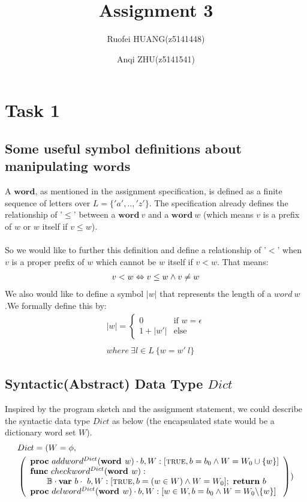 \documentclass[a4paper,12pt,fleqn]{scrartcl}
\title{Assignment 3}
\author{Ruofei HUANG(z5141448)\and
Anqi ZHU(z5141541)
}
\newcommand{\WORD}{\textbf{word }}
\begin{document}
\maketitle
\section{Task 1}
\subsection{Some useful symbol definitions about manipulating $\textbf{word}$s }
A $\textbf{word}$, as mentioned in the assignment specification, is defined as a 
finite sequence of letters over $L = \{'a', .., 'z'\}$. The specification 
already defines the relationship of '$\leq$' between a $\textbf{word}\ v$ and a 
$\textbf{word}\ w$ (which means $v$ is a prefix of $w$ or $w$ itself if 
$v\leq w$). 
\\\\
So we would like to further this definition and define a relationship of '$<$' 
when $v$ is a proper prefix of $w$ which cannot be $w$ itself if $v < w$. That 
means:
\begin{align*}
    v < w \Leftrightarrow v\leq w \wedge v\neq w
\end{align*}
We also would like to define a symbol $|w|$ that represents the length of a 
$word\ w$.We formally define this by:
\begin{align*}
    |w| = 
    \begin{cases}
        0 & \text{if } w = \epsilon\\
        1 + |w'| & \text{else }
    \end{cases}\\\\
    where\ \exists l\in L\ \{w = w'\ l\}
\end{align*} 
\subsection{Syntactic(Abstract) Data Type $Dict$ }
Inspired by the program sketch and the assignment statement, we could describe 
the syntactic data type $Dict$ as below (the encapsulated state would be a 
dictionary word set $W$).
\begin{align*}
    &Dict = 
    (
        W = \phi,  \\
        &\left( 
            \begin{array}{l}
                \PROC\ addword^{Dict}(\WORD w)\cdot 
                b, W:[\True, b = b_0\And W = W_0\cup \{w\}]\\
                \FUNC\ checkword^{Dict}(\WORD w):\\
                    \qquad \mathbb{B}\cdot
                    \VAR\ b\cdot\ b, W:[\True, b = (w\in W)\And W = W_0];\ 
                    \RETURN\ b\\
                \PROC\ delword^{Dict}(\WORD w)\cdot
                b, W:[ w\in W, b = b_0\And W = W_0 \backslash \{w\}]
            \end{array}
        \right)
    )
\end{align*}
\end{document}
